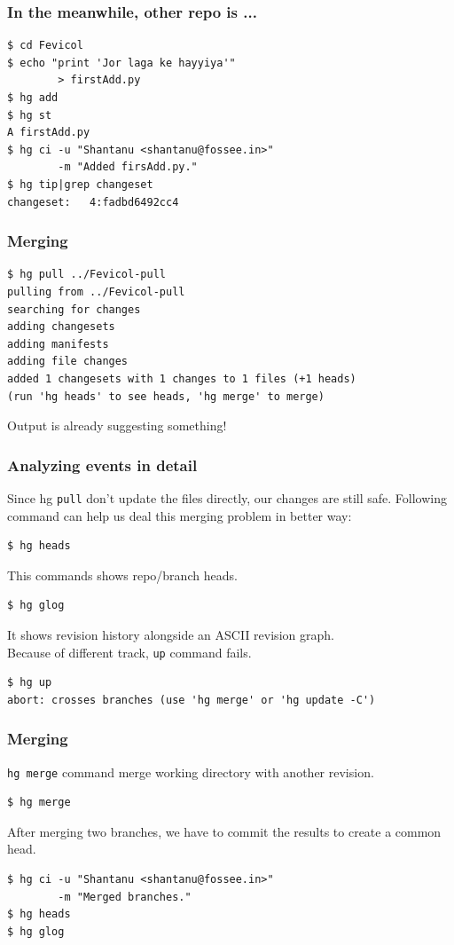 \documentclass[14pt,compress]{beamer}
\newcounter{time}
\newcommand{\inctime}[1]{\addtocounter{time}{#1}{\tiny \thetime\ m}}
\newcommand{\typ}[1]{\lstinline{#1}}
\begin{document}
\begin{frame}[fragile]
  \frametitle{In the meanwhile, other repo is ...}
  \begin{lstlisting}
$ cd Fevicol
$ echo "print 'Jor laga ke hayyiya'" 
        > firstAdd.py
$ hg add 
$ hg st
A firstAdd.py
$ hg ci -u "Shantanu <shantanu@fossee.in>"
        -m "Added firsAdd.py."
$ hg tip|grep changeset
changeset:   4:fadbd6492cc4    
  \end{lstlisting}
\end{frame}

\begin{frame}[fragile]
  \frametitle{Merging}
  \begin{lstlisting}
$ hg pull ../Fevicol-pull
pulling from ../Fevicol-pull
searching for changes
adding changesets
adding manifests
adding file changes
added 1 changesets with 1 changes to 1 files (+1 heads)
(run 'hg heads' to see heads, 'hg merge' to merge)    
  \end{lstlisting} %
  Output is already suggesting something!
\end{frame}

\begin{frame}[fragile]
  \frametitle{Analyzing events in detail}
  Since hg \typ{pull} don't update the files directly, our changes are still safe. Following command can help us deal this merging problem in better way:
  \begin{lstlisting}
$ hg heads
  \end{lstlisting}
  This commands shows repo/branch heads.
  \begin{lstlisting}
$ hg glog    
  \end{lstlisting}
  It shows revision history alongside an ASCII revision graph.\\
  Because of different track, \typ{up} command fails.
  \begin{lstlisting}
$ hg up
abort: crosses branches (use 'hg merge' or 'hg update -C')
  \end{lstlisting} %
\end{frame}

\begin{frame}[fragile]
  \frametitle{Merging}
  \typ{hg merge} command merge working directory with another revision.
  \begin{lstlisting}
$ hg merge    
  \end{lstlisting} %
  After merging two branches, we have to commit the results to create a common head.
  \begin{lstlisting}
$ hg ci -u "Shantanu <shantanu@fossee.in>" 
        -m "Merged branches."
$ hg heads    
$ hg glog
  \end{lstlisting} %
  \inctime{15}
\end{frame}
\end{document}

